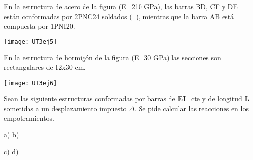 \ejercicio

En la estructura de acero de la figura (E=210 GPa), las barras BD, CF y DE están conformadas por 2PNC24 soldados ([]), mientras que la barra AB está compuesta por 1PNI20. 


\begin{center}
	\texttt{[image: UT3ej5]}
\end{center}



\ejercicio 

En la estructura de hormigón de la figura (E=30 GPa) las secciones son rectangulares de 12x30 cm. 

\begin{center}
	\texttt{[image: UT3ej6]}
\end{center}


\ejercicio


Sean las siguiente estructuras conformadas por barras de \textbf{EI}=cte y de longitud \textbf{L} sometidas a un desplazamiento impuesto $\Delta$. Se pide calcular las reacciones en los empotramientos.


\begin{center}
	\def\svgwidth{0.45\textwidth}
	a) 
	\def\svgwidth{0.45\textwidth}
	b) 
\end{center}



\begin{center}
	\def\svgwidth{0.45\textwidth}
	c) 
	\def\svgwidth{0.45\textwidth}
	d) 	
\end{center}


